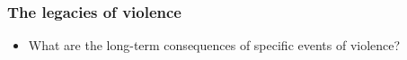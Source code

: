 \documentclass[aspectratio=43]{beamer}
\begin{document}

%
%





\begin{frame}
\frametitle{The legacies of violence}
\centering

\begin{itemize}
  \item What are the long-term consequences of specific events of violence?
\end{itemize}

\end{frame}


\end{document}
